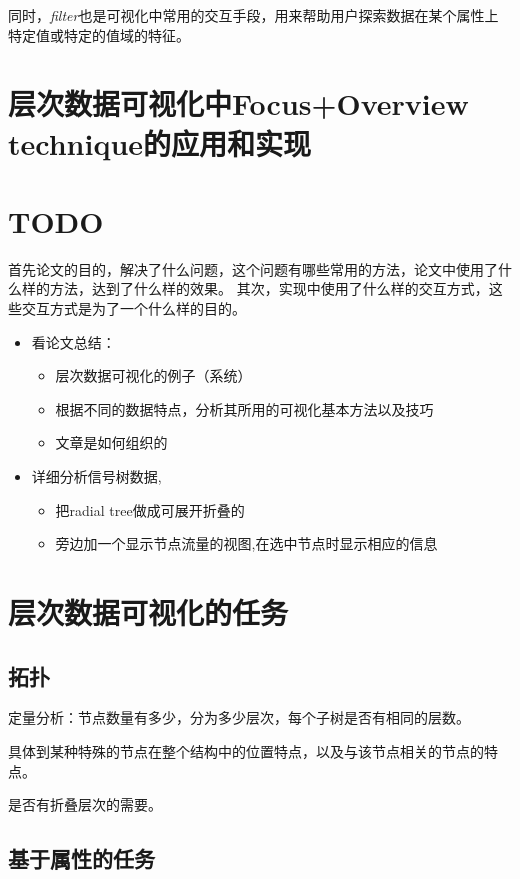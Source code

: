 \documentclass{article}
\begin{document}
同时，\emph{filter}也是可视化中常用的交互手段，用来帮助用户探索数据在某个属性上特定值或特定的值域的特征。


\section{层次数据可视化中Focus+Overview technique的应用和实现}

\section{TODO}

首先论文的目的，解决了什么问题，这个问题有哪些常用的方法，论文中使用了什么样的方法，达到了什么样的效果。
其次，实现中使用了什么样的交互方式，这些交互方式是为了一个什么样的目的。

\begin{itemize}
	\item 看论文总结：
		\begin{itemize}
			\item 层次数据可视化的例子（系统）
			\item 根据不同的数据特点，分析其所用的可视化基本方法以及技巧
			\item 文章是如何组织的
		\end{itemize}
	\item 详细分析信号树数据,
		\begin{itemize}
			\item 把radial tree做成可展开折叠的
			\item 旁边加一个显示节点流量的视图,在选中节点时显示相应的信息 
		\end{itemize}
\end{itemize}


\section{层次数据可视化的任务}

\subsection{拓扑}

定量分析：节点数量有多少，分为多少层次，每个子树是否有相同的层数。

具体到某种特殊的节点在整个结构中的位置特点，以及与该节点相关的节点的特点。

是否有折叠层次的需要。

\subsection{基于属性的任务}
\end{document}
